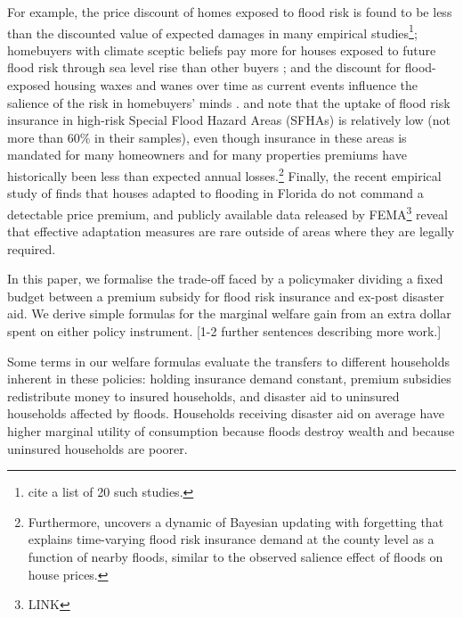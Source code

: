 \documentclass[12pt]{article}
\begin{document}
For example, the price discount of homes exposed to flood risk is found to be less than the discounted value of expected damages in many empirical studies\footnote{\cite{fairweather2024expecting} cite a list of 20 such studies.}; homebuyers with climate sceptic beliefs pay more for houses exposed to future flood risk through sea level rise than other buyers \citep{bernstein2019disaster,baldauf2020does,bakkensen2025leveraging}; and the discount for flood-exposed housing waxes and wanes over time as current events influence the salience of the risk in   homebuyers' minds \citep{keys2020neglected,giglio2021rfs}. \cite{wagner2022adaptation} and \cite{amornsiripanitch2025measuring} note that the uptake of flood risk insurance in high-risk Special Flood Hazard Areas (SFHAs) is relatively low (not more than 60$\%$ in their samples), even though insurance in these areas is mandated for many homeowners and for many properties premiums have historically been less than expected annual losses.\footnote{Furthermore, \cite{gallagher2014learning} uncovers a dynamic of Bayesian updating with forgetting that explains time-varying flood risk insurance demand at the county level as a function of nearby floods, similar to the observed salience effect of floods on house prices.} Finally, the recent empirical study of \cite{ostriker2022effects} finds that houses adapted to flooding in Florida do not command a detectable price premium, and publicly available data released by FEMA\footnote{LINK} reveal that effective adaptation measures are rare outside of areas where they are legally required.




In this paper, we formalise the trade-off faced by a policymaker dividing a fixed budget between a premium subsidy for flood risk insurance and ex-post disaster aid. We derive simple formulas for the marginal welfare gain from an extra dollar spent on either policy instrument. [1-2 further sentences describing more work.]

Some terms in our welfare formulas evaluate the transfers to different households inherent in these policies: holding insurance demand constant,  premium subsidies redistribute money to insured households, and disaster aid to uninsured households affected by floods. Households receiving disaster aid on average have higher marginal utility of consumption because floods destroy wealth and because uninsured households are poorer.
\end{document}
